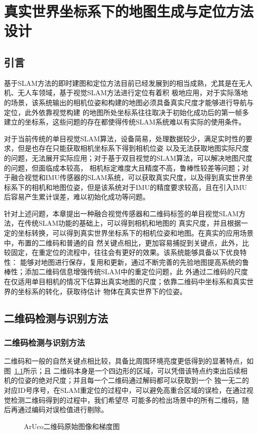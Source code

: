 \chapter{真实世界坐标系下的地图生成与定位方法设计}
\label{cha:chap2}

\section{引言}
\label{sec:2.1}
基于SLAM方法的即时建图和定位方法目前已经发展到的相当成熟，尤其是在无人机、无人车领域，基于视觉SLAM方法进行定位有着积
极地应用，对于实际落地的场景，该系统输出的相机位姿和构建的地图必须具备真实尺度才能够进行导航与定位，此外依靠视觉构建
的地图所处坐标系往往取决于初始化成功后的第一帧多建立的坐标系，这些问题的存在都使得传统SLAM系统难以有实际的使用条件。

对于当前传统的单目视觉SLAM算法，设备简易，处理数据较少，满足实时性的要求，但是也存在只能获取相机坐标系下得到相机位姿
以及无法获取地图实际尺度的问题，无法展开实际应用；对于基于双目视觉的SLAM算法，可以解决地图尺度的问题，但面临成本较高，
相机标定难度大且精度不高，鲁棒性较差等问题；对于融合视觉和IMU传感器的SLAM系统，可以获取真实尺度，以及得到真实世界坐
标系下的相机和地图位姿，但是该系统对于IMU的精度要求较高，且在引入IMU后容易产生累计误差，难以初始化成功等问题。

针对上述问题，本章提出一种融合视觉传感器和二维码标签的单目视觉SLAM方法，在传统SLAM功能的基础上，可以得到相机和地图的
真实尺度，并且根据一定的坐标转换，可以得到真实世界坐标系下的相机位姿和地图。在真实的应用场景中，布置的二维码和普通的自
然关键点相比，更加容易捕捉到关键点，此外，比较固定，在重定位的流程中，往往会有更好的效果。该系统能够具备以下优良特性：
能够对地图进行保存，复用和更新，通过不断完善的先验地图提高系统的鲁棒性；添加二维码信息增强传统SLAM中的重定位问题，此
外通过二维码的尺度在仅适用单目相机的情况下估算出真实地图的尺度；依靠二维码中坐标系和真实世界的坐标系的转化，获取待估计
物体在真实世界下的位姿。
\section{二维码检测与识别方法}
\label{sec:2.2}
\subsection{二维码检测与识别方法}
\label{sec:2.2.1}
二维码和一般的自然关键点相比较，具备比周围环境亮度更低得到的显著特点，如图~\ref{fig:Aruco_Aruco_Gradient}所示；且
二维码本身是一个四边形的区域，可以凭借该特点约束出后续相机的位姿的绝对尺度；并且每一个二维码通过解码都可以获取到一个
独一无二的对应ID号序号，在SLAM重定位的过程中，可以避免高重合区域的误检，在通过视觉检测二维码得到的过程中，我们希望尽
可能多的检出场景中的所有二维码，随后再通过编码对误检值进行剔除。
\begin{figure}[H]
  \centering%
  \hspace{6em}%
  \caption{ArUco二维码原始图像和梯度图}
  \label{fig:Aruco_Aruco_Gradient}
\end{figure}

